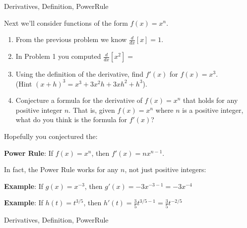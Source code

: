 \begin{tagblock}{Derivatives, Definition, PowerRule}
\begin{question}
	

\bigskip



Next we'll consider functions of the form $f(x) = x^n$.  
\begin{enumerate}
\item From the previous problem we know $\frac{d}{dx}[x]=1$.
\item In Problem 1 you computed $\frac{d}{dx}[x^2] = $


\item Using the definition of the derivative, find $f'(x)$ for $f(x) = x^3$. \\
(Hint $(x+h)^3 = x^3+3x^2h+3xh^2 + h^3$).  

\vfill

\item Conjecture a formula for the derivative of $f(x)=x^n$ that holds for any positive integer $n$. That is, given $f(x)=x^n$ where $n$ is a positive integer, what do you think is the formula for $f'(x)$?
\end{enumerate}
\newpage

Hopefully you conjectured the:

\begin{center}\textbf{Power Rule}: If $f(x) = x^n$, then $f'(x) = nx^{n-1}$. \end{center}

In fact, the Power Rule works for any $n$, not just positive integers:

\textbf{Example}: If $g(x) = x^{-3}$, then $g'(x) = -3x^{-3-1} = -3x^{-4}$ \\
\bigskip

\textbf{Example}: If $h(t) = t^{3/5}$, then $h'(t) = \frac{3}{5}t^{3/5-1} =  \frac{3}{5}t^{-2/5}$ \\






	
	
\begin{tags}
	    Derivatives, Definition, PowerRule
\end{tags}
	
\begin{diary}
\end{diary}
	
\begin{solution}
	   
\end{solution}
	
\end{question}

\end{tagblock}

